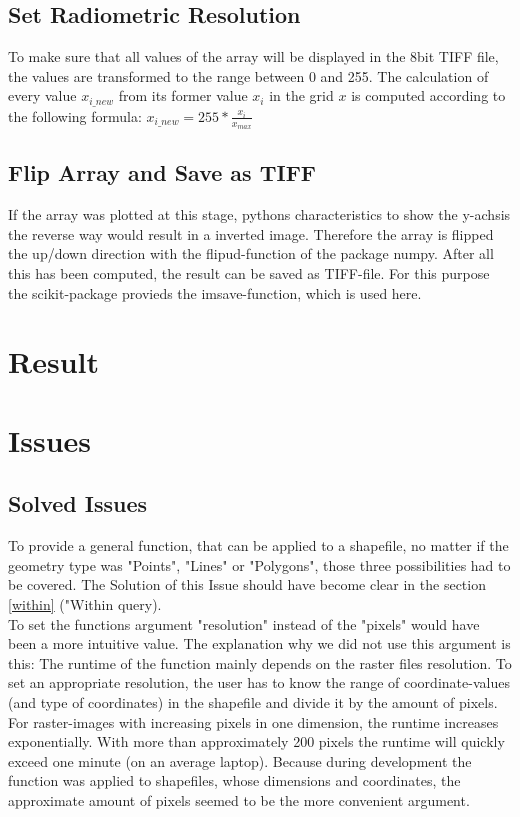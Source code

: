 \documentclass[10pt, a4paper]{article}
\begin{document}
	\subsection*{Set Radiometric Resolution}
	To make sure that all values of the array will be displayed in the 8bit TIFF file, the values are transformed to the range between 0 and 255. The calculation of every value $x_{i\_new}$ from its former value $x_i$ in the grid $x$ is computed according to the following formula:
	$ x_{i\_new} = 255 * \frac{x_i}{x_{max}} $
	
	\subsection*{Flip Array and Save as TIFF}
	If the array was plotted at this stage, pythons characteristics to show the y-achsis the reverse way would result in a inverted image. Therefore the array is flipped the up/down direction with the flipud-function of the package numpy.
	After all this has been computed, the result can be saved as TIFF-file. For this purpose the scikit-package provieds the imsave-function, which is used here.
	
	\section{Result}
	
	\section{Issues}
	
	\subsection*{Solved Issues}
	To provide a general function, that can be applied to a shapefile, no matter if the geometry type was "Points", "Lines" or "Polygons", those three possibilities had to be covered. The Solution of this Issue should have become clear in the section \ref{within} ("Within query).\\
	
	To set the functions argument "resolution" instead of the "pixels" would have been a more intuitive value. The explanation why we did not use this argument is this:
	The runtime of the function mainly depends on the raster files resolution. To set an appropriate resolution, the user has to know the range of coordinate-values (and type of coordinates) in the shapefile and divide it by the amount of pixels. For raster-images with increasing pixels in one dimension, the runtime increases exponentially. With more than approximately 200 pixels the runtime will quickly exceed one minute (on an average laptop). Because during development the function was applied to shapefiles, whose dimensions and coordinates, the approximate amount of pixels seemed to be the more convenient argument.\\
	
\end{document}
